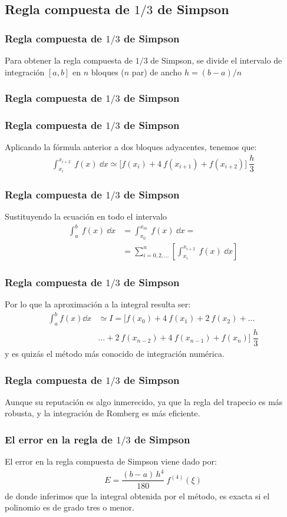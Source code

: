 \subsection{Regla compuesta de \texorpdfstring{$1/3$}{1/3} de Simpson}
\begin{frame}
\frametitle{Regla compuesta de $1/3$ de Simpson}
Para obtener la regla compuesta de $1/3$ de Simpson, se divide el intervalo de integración $[a, b]$ en $n$ bloques ($n$ par) de ancho $h = (b - a)/n$
\end{frame}
\begin{frame}
\frametitle{Regla compuesta de $1/3$ de Simpson}
\begin{figure}
	\centering
	
\end{figure}
\end{frame}
\begin{frame}
\frametitle{Regla compuesta de $1/3$ de Simpson}
Aplicando la fórmula anterior a dos bloques adyacentes, tenemos que:
\begin{align*}
\int_{x_{i}}^{x_{i + 2}} \: f(x) \: \dd{x} \simeq \bigg[ f(x_{i}) + 4 \: f(x_{i + 1}) + f(x_{i + 2}) \bigg] \: \dfrac{h}{3}
\end{align*}
\end{frame}
\begin{frame}
\frametitle{Regla compuesta de $1/3$ de Simpson}
Sustituyendo la ecuación en todo el intervalo
\begin{align*}
\int_{a}^{b} \: f(x) \: \dd{x} &= \int_{x_{0}}^{x_{m}} \: f(x) \: \dd{x} = \\
&= \sum_{i = 0, 2,\ldots}^{n} \left[ \int_{x_{i}}^{x_{i + 2}} \: f(x) \: \dd{x} \right]
\end{align*}
\end{frame}
\begin{frame}
\frametitle{Regla compuesta de $1/3$ de Simpson}
Por lo que la aproximación a la integral resulta ser:
\begin{align*}
\int_{a}^{b} f(x) \dd{x} &\simeq I = \bigg[ f(x_{0}) + 4 \: f(x_{1}) + 2 \: f(x_{2}) + \ldots  \\
& \ldots + 2 \: f(x_{n-2}) + 4 \: f(x_{n - 1}) + f(x_{n}) \bigg] \: \dfrac{h}{3}
\end{align*}
\pause
y es quizás el método más conocido de integración numérica. 
\end{frame}
\begin{frame}
\frametitle{Regla compuesta de $1/3$ de Simpson}
Aunque su reputación es algo inmerecido, ya que la regla del trapecio es más robusta, y la integración de Romberg es más eficiente.
\end{frame}
\begin{frame}
\frametitle{El error en la regla de $1/3$ de Simpson}
El error en la regla compuesta de Simpson viene dado por:
\begin{align*}
E = \dfrac{(b - a) \, h^{4}}{180} \: f^{(4)}(\xi)
\end{align*}
de donde inferimos que la integral obtenida por el método, es exacta si el polinomio es de grado tres o menor.
\end{frame}
